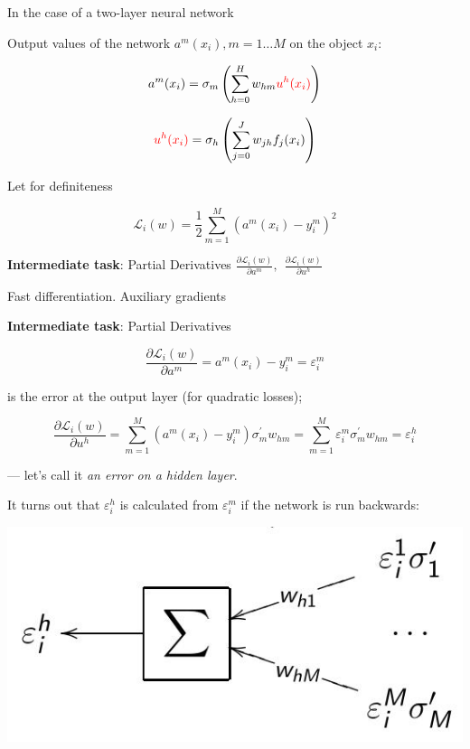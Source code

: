\documentclass[fullscreen=true, bookmarks=true, hyperref={pdfencoding=unicode}]{beamer}
\begin{document}
\begin{frame}{In the case of a two-layer neural network}

Output values of the network $a^m(x_i), m = 1 \dots M$ on the object $x_i$:

$$a^m(x_i) = \sigma_m \left( \sum\limits_{h=0}^H w_{hm} {\color{red}u^h(x_i)} \right)$$

$${\color{red}u^h(x_i)} = \sigma_h \left( \sum\limits_{j=0}^J w_{jh} f_j(x_i) \right)$$

Let for definiteness

$$\mathcal{L}_i (w) = \frac12 \sum\limits_{m=1}^M (a^m(x_i) - y_i^m)^2$$

{\bf Intermediate task}: Partial Derivatives
$\frac{\partial \mathcal{L}_i(w)}{\partial a^m},\ \ \frac{\partial \mathcal{L}_i(w)}{\partial u^h}$    
\end{frame}


\begin{frame}{Fast differentiation. Auxiliary gradients}

{\bf Intermediate task}: Partial Derivatives

$$\frac{\partial \mathcal{L}_i(w)}{\partial a^m} = a^m(x_i) - y_i^m = \varepsilon_i^m$$

is the error at the output layer (for quadratic losses);

$$\frac{\partial \mathcal{L}_i(w)}{\partial u^h} = \sum\limits_{m=1}^M (a^m(x_i) - y_i^m) \sigma_m^ \prime w_{hm} =
  \sum\limits_{m=1}^M \varepsilon_i^m \sigma_m^\prime w_{hm} = \varepsilon_i^h$$

— let's call it {\it an error on a hidden layer}.

It turns out that $\varepsilon_i^h$ is calculated from $\varepsilon_i^m$ if the network is run backwards:

\begin{center}
  \includegraphics[keepaspectratio, width=0.45\paperwidth]{backprop_eps.jpg}
\end{center}
\end{frame}
\end{document}
